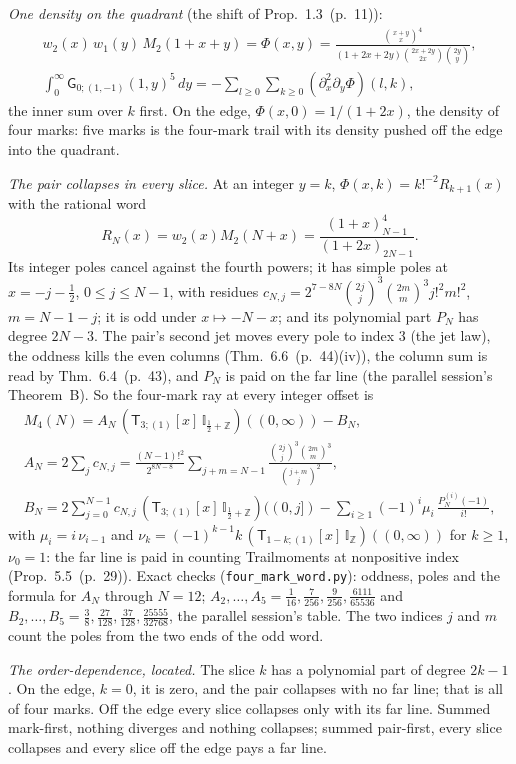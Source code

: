 \documentclass[11pt]{article}
\newcommand{\sG}{\mathsf G}
\newcommand{\sT}{\mathsf T}
\newcommand{\IZ}{\mathbb I_{\mathbb Z}}
\newcommand{\Ilat}[1]{\mathbb I_{#1}}
\newcommand{\Tx}[3]{(\sT_{#1;(1)}[x]\,#2)((#3,\infty))}
\newcommand{\Th}[4]{(\sT_{#1;(1)}[x]\,#2)((#3,#4])}
\newcommand{\hb}[2]{#1~(p.~#2)}   %
\theoremstyle{plain}
\theoremstyle{remark}
\begin{document}
\emph{One density on the quadrant} (the shift of Prop.~\hb{1.3}{11}):
\begin{gather*}
w_2(x)\,w_1(y)\,M_2(1+x+y)=\Phi(x,y)=\frac{\binom{x+y}x^4}{(1+2x+2y)\binom{2x+2y}{2x}\binom{2y}y},\\
\int_0^\infty\sG_{0;(1,-1)}(1,y)^5\,dy=-\sum_{l\ge0}\sum_{k\ge0}(\partial_x^2\partial_y\Phi)(l,k),
\end{gather*}
the inner sum over $k$ first. On the edge, $\Phi(x,0)=1/(1+2x)$, the density of four marks: five marks is the four-mark trail with its density pushed off the edge into the quadrant.

\emph{The pair collapses in every slice.} At an integer $y=k$, $\Phi(x,k)=k!^{-2}R_{k+1}(x)$ with the rational word
\[
R_N(x)=w_2(x)M_2(N+x)=\frac{(1+x)_{N-1}^4}{(1+2x)_{2N-1}}.
\]
Its integer poles cancel against the fourth powers; it has simple poles at $x=-j-\frac12$, $0\le j\le N-1$, with residues $c_{N,j}=2^{7-8N}\binom{2j}j^3\binom{2m}m^3j!^2m!^2$, $m=N-1-j$; it is odd under $x\mapsto-N-x$; and its polynomial part $P_N$ has degree $2N-3$. The pair's second jet moves every pole to index $3$ (the jet law), the oddness kills the even columns (Thm.~\hb{6.6}{44}(iv)), the column sum is read by Thm.~\hb{6.4}{43}, and $P_N$ is paid on the far line (the parallel session's Theorem~B). So the four-mark ray at every integer offset is
\begin{gather*}
M_4(N)=A_N\,\Tx3{\Ilat{\frac12+\mathbb Z}}0-B_N,\\
A_N=2\sum_jc_{N,j}=\frac{(N-1)!^2}{2^{8N-8}}\sum_{j+m=N-1}\frac{\binom{2j}j^3\binom{2m}m^3}{\binom{j+m}j^2},\\
B_N=2\sum_{j=0}^{N-1}c_{N,j}\,\Th{3}{\Ilat{\frac12+\mathbb Z}}{0}{j}-\sum_{i\ge1}(-1)^i\mu_i\,\frac{P_N^{(i)}(-1)}{i!},
\end{gather*}
with $\mu_i=i\,\nu_{i-1}$ and $\nu_k=(-1)^{k-1}k\,\Tx{1-k}{\IZ}{0}$ for $k\ge1$, $\nu_0=1$: the far line is paid in counting Trailmoments at nonpositive index (Prop.~\hb{5.5}{29}). Exact checks (\texttt{four\_mark\_word.py}): oddness, poles and the formula for $A_N$ through $N=12$; $A_2,\dots,A_5=\frac1{16},\frac7{256},\frac9{256},\frac{6111}{65536}$ and $B_2,\dots,B_5=\frac38,\frac{27}{128},\frac{37}{128},\frac{25555}{32768}$, the parallel session's table. The two indices $j$ and $m$ count the poles from the two ends of the odd word.

\emph{The order-dependence, located.} The slice $k$ has a polynomial part of degree $2k-1$. On the edge, $k=0$, it is zero, and the pair collapses with no far line; that is all of four marks. Off the edge every slice collapses only with its far line. Summed mark-first, nothing diverges and nothing collapses; summed pair-first, every slice collapses and every slice off the edge pays a far line.
\end{document}
